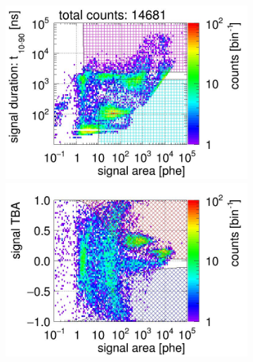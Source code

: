 \begin{landscape}%
	\begin{figure}[!p]
		\centering
		\begin{subfigure}[t]{0.33\textwidth} %
			\centering
			\includegraphics[width=\figurewidth,clip,trim={0 98 0 0}]{Figures/GasTest/CutsValid/res64767/pdpa22Vecfig64767.jpg}
			\includegraphics[width=\figurewidth,clip,trim={0 0 0 40}]{Figures/GasTest/CutsValid/res64767/tbapa22Vecfig64767.jpg}
			\caption{}
			\label{fig:signal selection dv 12 01}
		\end{subfigure}
		\begin{subfigure}[t]{0.33\textwidth}
			\centering

\end{subfigure}
\end{figure}
\end{landscape}
